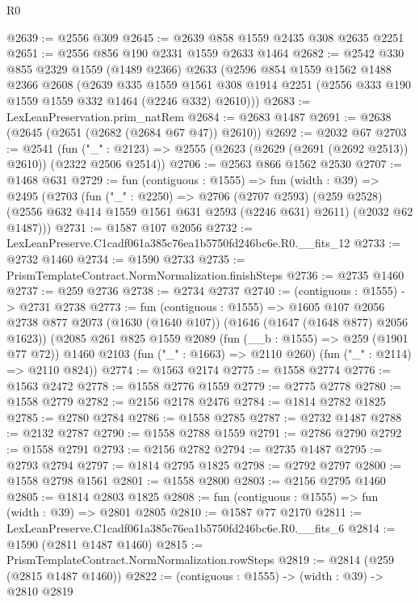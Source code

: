 \begin{lexlean}{R0}
\begin{coremodule}
@2639 := @2556 @309
@2645 := @2639 @858 @1559 @2435 @308 @2635 @2251
@2651 := @2556 @856 @190 @2331 @1559 @2633 @1464
@2682 := @2542
    @330
    @855
    @2329
    @1559
    (@1489 @2366)
    @2633
    (@2596
      @854
      @1559
      @1562
      @1488
      @2366
      @2608
      (@2639
        @335
        @1559
        @1561
        @308
        @1914
        @2251
        (@2556 @333 @190 @1559 @1559 @332 @1464 (@2246 @332) @2610)))
@2683 := LexLeanPreservation.prim_natRem
@2684 := @2683 @1487
@2691 := @2638 (@2645 (@2651 (@2682 (@2684 @67 @47)) @2610))
@2692 := @2032 @67
@2703 := @2541
    (fun ("_" : @2123) => @2555 (@2623 (@2629 (@2691 (@2692 @2513)) @2610)) (@2322 @2506 @2514))
@2706 := @2563 @866 @1562 @2530
@2707 := @1468 @631
@2729 := fun (contiguous : @1555) =>
  fun (width : @39) =>
  @2495
    (@2703
      (fun ("_" : @2250) =>
      @2706
        (@2707 @2593)
        (@259 @2528)
        (@2556 @632 @414 @1559 @1561 @631 @2593 (@2246 @631) @2611)
        (@2032 @62 @1487)))
@2731 := @1587 @107 @2056
@2732 := LexLeanPreserve.C1cadf061a385c76ea1b5750fd246bc6e.R0.__fits_12
@2733 := @2732 @1460
@2734 := @1590 @2733
@2735 := PrismTemplateContract.NormNormalization.finishSteps
@2736 := @2735 @1460
@2737 := @259 @2736
@2738 := @2734 @2737
@2740 := (contiguous : @1555) -> @2731 @2738
@2773 := fun (contiguous : @1555) =>
  @1605
    @107
    @2056
    @2738
    @877
    @2073
    (@1630 (@1640 @107))
    (@1646 (@1647 (@1648 @877) @2056 @1623))
    (@2085
      @261
      @825
      @1559
      @2089
      (fun (__b : @1555) => @259 (@1901 @77 @72))
      @1460
      @2103
      (fun ("_" : @1663) => @2110 @260)
      (fun ("_" : @2114) => @2110 @824))
@2774 := @1563 @2174
@2775 := @1558 @2774
@2776 := @1563 @2472
@2778 := @1558 @2776 @1559
@2779 := @2775 @2778
@2780 := @1558 @2779
@2782 := @2156 @2178 @2476
@2784 := @1814 @2782 @1825
@2785 := @2780 @2784
@2786 := @1558 @2785
@2787 := @2732 @1487
@2788 := @2132 @2787
@2790 := @1558 @2788 @1559
@2791 := @2786 @2790
@2792 := @1558 @2791
@2793 := @2156 @2782
@2794 := @2735 @1487
@2795 := @2793 @2794
@2797 := @1814 @2795 @1825
@2798 := @2792 @2797
@2800 := @1558 @2798 @1561
@2801 := @1558 @2800
@2803 := @2156 @2795 @1460
@2805 := @1814 @2803 @1825
@2808 := fun (contiguous : @1555) => fun (width : @39) => @2801 @2805
@2810 := @1587 @77 @2170
@2811 := LexLeanPreserve.C1cadf061a385c76ea1b5750fd246bc6e.R0.__fits_6
@2814 := @1590 (@2811 @1487 @1460)
@2815 := PrismTemplateContract.NormNormalization.rowSteps
@2819 := @2814 (@259 (@2815 @1487 @1460))
@2822 := (contiguous : @1555) -> (width : @39) -> @2810 @2819

\end{coremodule}
\end{lexlean}
